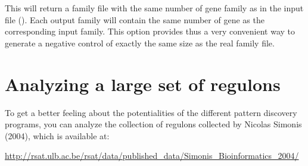 This will return a family file with the same number of gene family as
in the input file (). Each output family will contain
the same number of gene as the corresponding input family. This option
provides thus a very convenient way to generate a negative control of
exactly the same size as the real family file.

\section{Analyzing a large set of regulons}

To get a better feeling about the potentialities of the different
pattern discovery programs, you can analyze the collection of regulons
collected by Nicolas Simonis (2004), which is available at:

\small{\url{http://rsat.ulb.ac.be/rsat/data/published\_data/Simonis\_Bioinformatics\_2004/}}

